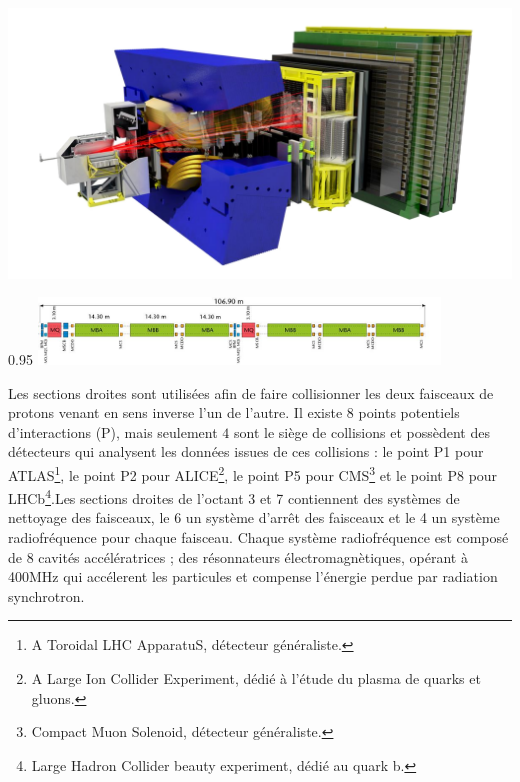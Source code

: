 \marginpar
{
	
	\includegraphics[width=\marginparwidth]{LHC/lhcb.png}
	\label{lhcb}
}
\begin{minipagewithmarginpars}[h]{0.95\textwidth}
	\centering
	\includegraphics[width=0.8\textwidth]{LHC/arc.jpg}
	\label{fodo}	
\end{minipagewithmarginpars}

Les sections droites sont utilisées afin de faire collisionner les deux faisceaux de protons venant en sens inverse l'un de l'autre. Il existe $8$ points potentiels d'interactions (P), mais seulement $4$ sont le siège de collisions et possèdent des détecteurs qui analysent les données issues de ces collisions : le point P1 pour ATLAS\footnote{A Toroidal LHC ApparatuS, détecteur généraliste.}, le point P2 pour ALICE\footnote{A Large Ion Collider Experiment, dédié à l'étude du plasma de quarks et gluons.}, le point P5 pour CMS\footnote{Compact Muon Solenoid, détecteur généraliste.} et le point P8 pour LHCb\footnote{Large Hadron Collider beauty experiment, dédié au quark b.}.Les sections droites de l'octant 3 et 7 contiennent des systèmes de nettoyage des faisceaux, le 6 un système d'arrêt des faisceaux et le 4 un système radiofréquence pour chaque faisceau. Chaque système radiofréquence est composé de 8 cavités accélératrices ; des résonnateurs électromagnètiques, opérant à 400MHz qui accélerent les particules et compense l'énergie perdue par radiation synchrotron.


